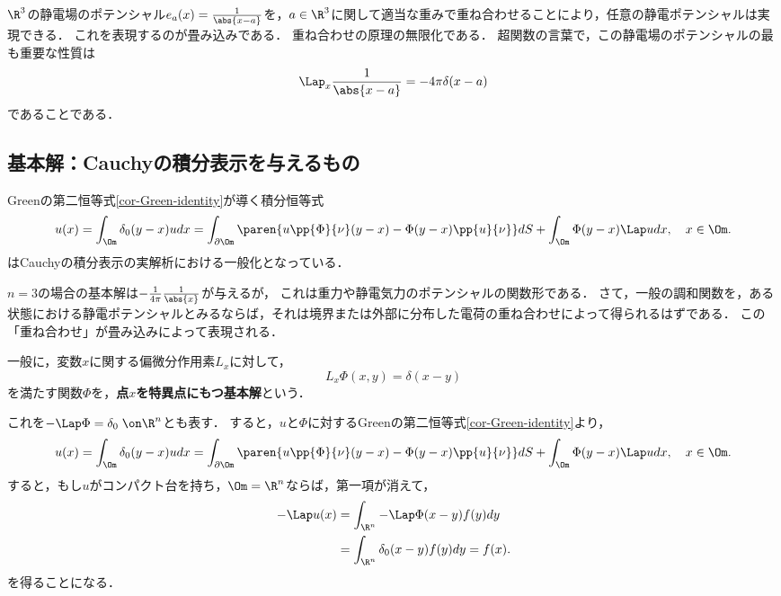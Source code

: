 \documentclass[uplatex,dvipdfmx]{jsreport}
\begin{document}
\begin{remarks}
    $\R^3$の静電場のポテンシャル$e_a(x)=\frac{1}{\abs{x-a}}$を，$a\in\R^3$に関して適当な重みで重ね合わせることにより，任意の静電ポテンシャルは実現できる．
    これを表現するのが畳み込みである．
    重ね合わせの原理の無限化である．
    超関数の言葉で，この静電場のポテンシャルの最も重要な性質は
    \[\Lap_x\frac{1}{\abs{x-a}}=-4\pi\delta(x-a)\]
    であることである．
\end{remarks}

\subsection{基本解：Cauchyの積分表示を与えるもの}

\begin{tcolorbox}[colframe=ForestGreen, colback=ForestGreen!10!white,breakable,colbacktitle=ForestGreen!40!white,coltitle=black,fonttitle=\bfseries\sffamily,
title=]
    Greenの第二恒等式\ref{cor-Green-identity}が導く積分恒等式
    \[u(x)=\int_{\Om}\delta_0(y-x)udx=\int_{\partial\Om}\paren{u\pp{\Phi}{\nu}(y-x)-\Phi(y-x)\pp{u}{\nu}}dS+\int_\Om\Phi(y-x)\Lap udx,\quad x\in\Om.\]
    はCauchyの積分表示の実解析における一般化となっている．
\end{tcolorbox}

\begin{remarks}
    $n=3$の場合の基本解は$-\frac{1}{4\pi}\frac{1}{\abs{x}}$が与えるが，
    これは重力や静電気力のポテンシャルの関数形である．
    さて，一般の調和関数を，ある状態における静電ポテンシャルとみるならば，それは境界または外部に分布した電荷の重ね合わせによって得られるはずである．
    この「重ね合わせ」が畳み込みによって表現される．
\end{remarks}

\begin{definition}
    一般に，変数$x$に関する偏微分作用素$L_x$に対して，
    \[L_x\Phi(x,y)=\delta(x-y)\]
    を満たす関数$\Phi$を，\textbf{点$x$を特異点にもつ基本解}という．
\end{definition}
\begin{remarks}\label{remarks-Green}
    これを$-\Lap\Phi=\delta_0\;\on\R^n$とも表す．
    すると，$u$と$\Phi$に対するGreenの第二恒等式\ref{cor-Green-identity}より，
    \[u(x)=\int_{\Om}\delta_0(y-x)udx=\int_{\partial\Om}\paren{u\pp{\Phi}{\nu}(y-x)-\Phi(y-x)\pp{u}{\nu}}dS+\int_\Om\Phi(y-x)\Lap udx,\quad x\in\Om.\]
    すると，もし$u$がコンパクト台を持ち，$\Om=\R^n$ならば，第一項が消えて，
    \begin{align*}
        -\Lap u(x)&=\int_{\R^n}-\Lap\Phi(x-y)f(y)dy\\
        &=\int_{\R^n}\delta_0(x-y)f(y)dy=f(x).
    \end{align*}
    を得ることになる．
\end{remarks}
\end{document}
